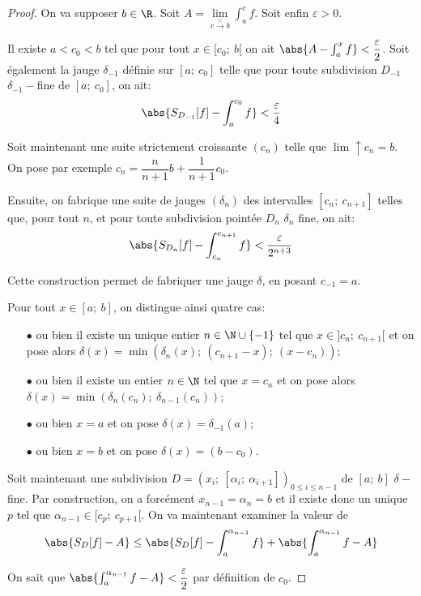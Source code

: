 \begin{proof}
On va supposer $b \in \R$. Soit $A = \lim \limits_{c \overset{<}{\to} b} \int_a^c f$. Soit enfin $\varepsilon>0$.

Il existe $a < c_0 < b$ tel que pour tout $x \in [c_0;~b[$ on ait $\abs{A-\int_a^x f} < \dfrac{\varepsilon}{2}$. Soit également la jauge $\delta_{-1}$ définie sur $[a;~c_0]$ telle que pour toute subdivision $D_{-1}$ $\delta_{-1}-$fine de $[a;~{c_0}]$, on ait:
\[
\abs{S_{D_{-1}}[f] - \int_a^{c_0} f} < \dfrac{\varepsilon}{4}
\]

Soit maintenant une suite strictement croissante $(c_n)$ telle que $\lim \uparrow c_n = b$. On pose par exemple $c_n = \dfrac{n}{n+1}b + \dfrac{1}{n+1}c_0$.

Ensuite, on fabrique une suite de jauges $(\delta_n)$ des intervalles $[c_n;~c_{n+1}]$ telles que, pour tout $n$, et pour toute subdivision pointée $D_n$ $\delta_n$ fine, on ait:
\[
\abs{S_{D_n}[f] - \int_{c_n}^{c_{n+1}}f } < \dfrac{\varepsilon}{2^{n+3}}
\]

Cette construction permet de fabriquer une jauge $\delta$, en posant $c_{-1}=a$.

Pour tout $x \in [a;~b]$, on distingue ainsi quatre cas:
\begin{itemize}
\item[$\bullet$]
ou bien il existe un unique entier $n \in \N \cup \{-1\}$ tel que $x \in ]c_n;~c_{n+1}[$ et on pose alors $\delta(x) = \min\left (\delta_n(x);~(c_{n+1}-x);~(x-c_n)\right )$;
\item[$\bullet$]
ou bien il existe un entier $n \in \N$ tel que $x=c_n$ et on pose alors $\delta(x) = \min\left(\delta_n(c_n);~\delta_{n-1}(c_n) \right)$;
\item[$\bullet$]
ou bien $x=a$ et on pose $\delta(x) = \delta_{-1}(a)$;
\item[$\bullet$]
ou bien $x=b$ et on pose $\delta(x) = (b-c_0)$.
\end{itemize}

Soit maintenant une subdivision $D = (x_i;~[\alpha_i;~\alpha_{i+1}])_{0 \leq i \leq n-1}$ de $[a;~b]$ $\delta-$fine. Par construction, on a forcément $x_{n-1} = \alpha_n = b$ et il existe donc un unique $p$ tel que $\alpha_{n-1} \in [c_p;~c_{p+1}[$. On va maintenant examiner la valeur de 
\[
\abs{S_D[f]-A} \leq \abs{S_D[f]-\int_a^{\alpha_{n-1}} f} +  \abs{\int_a^{\alpha_{n-1}} f - A}
\]

On sait que  $\abs{\int_a^{\alpha_{n-1}} f - A} < \dfrac{\varepsilon}{2}$ par définition de $c_0$. 


\end{proof}
